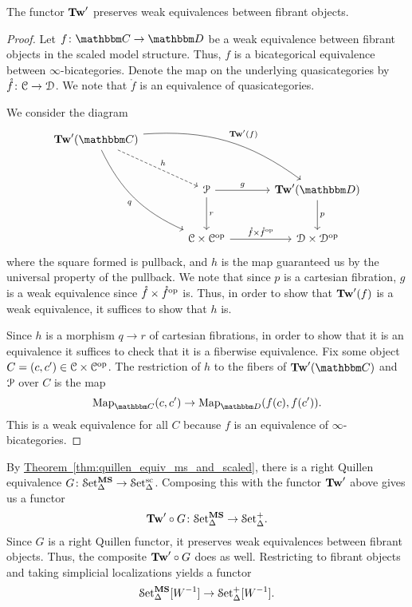 \documentclass[main.tex]{subfiles}
\begin{document}
\begin{lemma}
  The functor $\mathbf{Tw}'$ preserves weak equivalences between fibrant objects.
\end{lemma}
\begin{proof}
  Let $f\colon \CC \to \DD$ be a weak equivalence between fibrant objects in the scaled model structure. Thus, $f$ is a bicategorical equivalence between $\infty$-bicategories. Denote the map on the underlying quasicategories by $\mathring{f}\colon \mathcal{C} \to \mathcal{D}$. We note that $\mathring{f}$ is an equivalence of quasicategories.

  We consider the diagram
  \begin{equation*}
    \begin{tikzcd}[row sep=large, column sep=large]
      \Tw'(\CC)
      \arrow[drr, bend left=20, "\Tw'(f)"]
      \arrow[ddr, bend right=20, swap, "q"]
      \arrow[dr, dashed, "h"]
      \\
      & \mathcal{P}
      \arrow[r, "g"]
      \arrow[d, "r"]
      & \Tw'(\DD)
      \arrow[d, "p"]
      \\
      & \category{C} \times \category{C}\op
      \arrow[r, "\mathring{f} \times \mathring{f}\op"]
      & \category{D} \times \category{D}\op
    \end{tikzcd}
  \end{equation*}
  where the square formed is pullback, and $h$ is the map guaranteed us by the universal property of the pullback. We note that since $p$ is a cartesian fibration, $g$ is a weak equivalence since $\mathring{f} \times \mathring{f}^{\mathrm{op}}$ is. Thus, in order to show that $\mathbf{Tw}'(f)$ is a weak equivalence, it suffices to show that $h$ is.

  Since $h$ is a morphism $q \to r$ of cartesian fibrations, in order to show that it is an equivalence it suffices to check that it is a fiberwise equivalence. Fix some object $C = (c, c') \in \mathcal{C} \times \mathcal{C}^{\mathrm{op}}$. The restriction of $h$ to the fibers of $\Tw'(\CC)$ and $\mathcal{P}$ over $C$ is the map
  \begin{equation*}
    \Map_{\CC}(c, c') \to \Map_{\DD}(f(c), f(c')).
  \end{equation*}
  This is a weak equivalence for all $C$ because $f$ is an equivalence of $\infty$-bicategories.
\end{proof}

By \hyperref[thm:quillen_equiv_ms_and_scaled]{Theorem~\ref*{thm:quillen_equiv_ms_and_scaled}}, there is a right Quillen equivalence $G\colon \mathcal{S}\mathrm{et}_{\Delta}^{\mathbf{MS}} \to \mathcal{S}\mathrm{et}_{\Delta}^{\mathrm{sc}}$. Composing this with the functor $\mathbf{Tw}'$ above gives us a functor
\begin{equation*}
  \mathbf{Tw}' \circ G\colon \mathcal{S}\mathrm{et}_{\Delta}^{\mathbf{MS}} \to \mathcal{S}\mathrm{et}_{\Delta}^{+}.
\end{equation*}
Since $G$ is a right Quillen functor, it preserves weak equivalences between fibrant objects. Thus, the composite $\mathbf{Tw}' \circ G$ does as well. Restricting to fibrant objects and taking simplicial localizations yields a functor
\begin{equation*}
  \mathcal{S}\mathrm{et}_{\Delta}^{\mathbf{MS}}[W^{-1}] \to \mathcal{S}\mathrm{et}_{\Delta}^{+}[W^{-1}].
\end{equation*}
\end{document}
